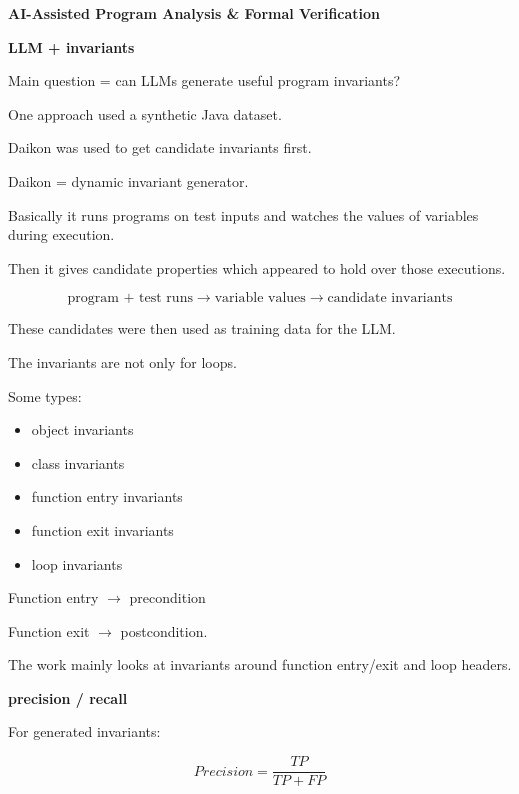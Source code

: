 \documentclass[11pt]{article}
\begin{document}
{\large \textbf{AI-Assisted Program Analysis \& Formal Verification}}

\vspace{4pt}



\vspace{6pt}

\textbf{LLM + invariants}

Main question = can LLMs generate useful program
invariants?

One approach used a synthetic Java dataset.

Daikon was used to get candidate invariants first.

Daikon = dynamic invariant generator.

Basically it runs programs on test inputs and watches
the values of variables during execution.

Then it gives candidate properties which appeared
to hold over those executions.

\[
\text{program + test runs}
\rightarrow
\text{variable values}
\rightarrow
\text{candidate invariants}
\]

These candidates were then used as training data
for the LLM.

\vspace{7pt}

The invariants are not only for loops.

Some types:

\begin{itemize}[leftmargin=18pt,itemsep=1pt]
    \item object invariants
    \item class invariants
    \item function entry invariants
    \item function exit invariants
    \item loop invariants
\end{itemize}

Function entry $\rightarrow$ precondition

Function exit $\rightarrow$ postcondition.

The work mainly looks at invariants around function
entry/exit and loop headers.

\vspace{7pt}

\textbf{precision / recall}

For generated invariants:

\[
Precision = \frac{TP}{TP+FP}
\]
\end{document}
